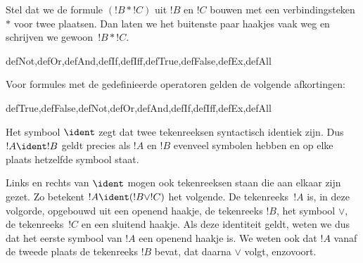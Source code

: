 \documentclass[../../../include/open-logic-section]{subfiles}
\begin{document}
Stel dat we de formule $(!B \ast !C)$ uit $!B$ en $!C$ bouwen met een
verbindingsteken~$\ast$ voor twee plaatsen. Dan laten we het buitenste
paar haakjes vaak weg en schrijven we gewoon~$!B \ast !C$.

\begin{tagblock}{defNot,defOr,defAnd,defIf,defIff,defTrue,defFalse,defEx,defAll}
\begin{defn}
Voor formules met de gedefinieerde operatoren gelden de volgende
afkortingen:

\begin{tagenumerate}{defTrue,defFalse,defNot,defOr,defAnd,defIf,defIff,defEx,defAll}







\end{tagenumerate}
\end{defn}
\end{tagblock}

\begin{defn}
Het symbool $\ident$ zegt dat twee tekenreeksen syntactisch identiek
zijn. Dus $!A \ident !B$ geldt precies als $!A$ en $!B$ evenveel
symbolen hebben en op elke plaats hetzelfde symbool staat.
\end{defn}

Links en rechts van $\ident$ mogen ook tekenreeksen staan die aan
elkaar zijn gezet. Zo betekent $!A \ident (!B \lor !C)$ het volgende.
De tekenreeks~$!A$ is, in deze volgorde, opgebouwd uit een openend
haakje, de tekenreeks $!B$, het symbool $\lor$, de tekenreeks~$!C$ en
een sluitend haakje. Als deze identiteit geldt, weten we dus dat het
  eerste symbool van $!A$ een openend haakje is. We weten ook dat $!A$
  vanaf de tweede plaats de tekenreeks $!B$ bevat, dat daarna $\lor$
volgt, enzovoort.
\end{document}
